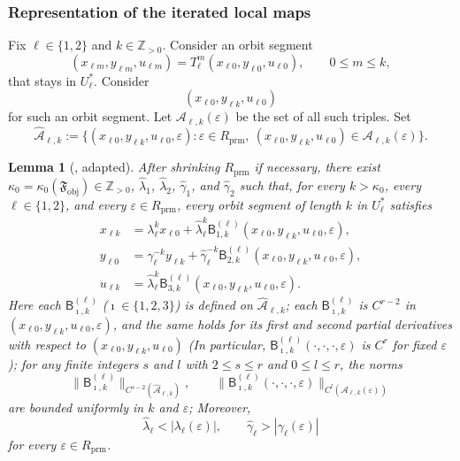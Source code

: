\documentclass[11pt,a4paper]{article}
\theoremstyle{plain}
\newtheorem{lemma}[theorem]{Lemma}
\theoremstyle{definition}
\theoremstyle{plain}
\numberwithin{equation}{section}
\begin{document}
\subsubsection{Representation of the iterated local maps}

Fix $\ell \in \{1,2\}$ and $k \in \mathbb{Z}_{>0}$. Consider an orbit segment
\[
(x_{\ell m},y_{\ell m},u_{\ell m}) = T_\ell^m(x_{\ell 0},y_{\ell 0},u_{\ell 0}),
\qquad
0 \le m \le k,
\]
that stays in $U_\ell^*$. Consider
\[
(x_{\ell 0},y_{\ell k},u_{\ell 0})
\]
for such an orbit segment. Let $\mathcal{A}_{\ell,k}(\varepsilon)$ be the set of all such triples. Set
\[
\widehat{\mathcal{A}}_{\ell,k}
:=
\{(x_{\ell 0},y_{\ell k},u_{\ell 0},\varepsilon) : \varepsilon \in R_\mathrm{prm},\ (x_{\ell 0},y_{\ell k},u_{\ell 0}) \in \mathcal{A}_{\ell,k}(\varepsilon)\}.
\]

\begin{lemma}[{\cite[Lemma~7]{GST2008}, adapted}]
\label{lem-ILMs}
After shrinking $R_\mathrm{prm}$ if necessary, there exist $\kappa_0 = \kappa_0(\mathfrak{F}_\mathrm{obj}) \in \mathbb{Z}_{>0}$, $\widehat{\lambda}_1$, $\widehat{\lambda}_2$, $\widehat{\gamma}_1$, and $\widehat{\gamma}_2$ such that, for every $k > \kappa_0$, every $\ell \in \{1,2\}$, and every $\varepsilon \in R_\mathrm{prm}$, every orbit segment of length $k$ in $U_\ell^*$ satisfies
\begin{align*}
x_{\ell k}
&=
\lambda_\ell^k x_{\ell 0}
+
\widehat{\lambda}_\ell^k
\mathsf{B}_{1,k}^{(\ell)}(x_{\ell 0},y_{\ell k},u_{\ell 0},\varepsilon), \\
y_{\ell 0}
&=
\gamma_\ell^{-k} y_{\ell k}
+
\widehat{\gamma}_\ell^{-k}
\mathsf{B}_{2,k}^{(\ell)}(x_{\ell 0},y_{\ell k},u_{\ell 0},\varepsilon), \\
u_{\ell k}
&=
\widehat{\lambda}_\ell^k
\mathsf{B}_{3,k}^{(\ell)}(x_{\ell 0},y_{\ell k},u_{\ell 0},\varepsilon).
\end{align*}
Here each $\mathsf{B}_{\imath,k}^{(\ell)}$ ($\imath \in \{1, 2, 3\}$) is defined on $\widehat{\mathcal{A}}_{\ell,k}$; each $\mathsf{B}_{\imath,k}^{(\ell)}$ is $C^{r-2}$ in $(x_{\ell 0},y_{\ell k},u_{\ell 0},\varepsilon)$, and the same holds for its first and second partial derivatives with respect to $(x_{\ell 0},y_{\ell k},u_{\ell 0})$ (In particular, $\mathsf{B}_{\imath,k}^{(\ell)}(\cdot, \cdot, \cdot, \varepsilon)$ is $C^r$ for fixed $\varepsilon$); for any finite integers $s$ and $l$ with $2 \le s \le r$ and $0 \le l \le r$, the norms
\[
\|\mathsf{B}_{\imath,k}^{(\ell)}\|_{C^{s-2}(\widehat{\mathcal{A}}_{\ell,k})}, \qquad \|\mathsf{B}_{\imath,k}^{(\ell)}(\cdot, \cdot, \cdot, \varepsilon)\|_{C^{l}(\mathcal{A}_{\ell,k}(\varepsilon))}
\]
are bounded uniformly in $k$ and $\varepsilon$; Moreover,
\[
\widehat{\lambda}_\ell < |\lambda_\ell(\varepsilon)|,
\qquad
\widehat{\gamma}_\ell > |\gamma_\ell(\varepsilon)|
\]
for every $\varepsilon \in R_\mathrm{prm}$.
\end{lemma}
\end{document}
